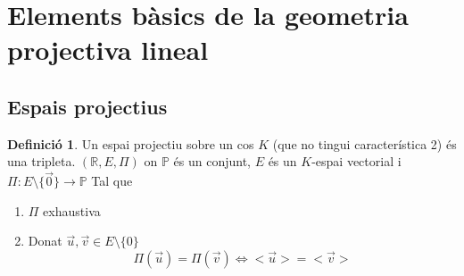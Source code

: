 \documentclass{article}
\theoremstyle{definition}
\newtheorem{definition}[theorem]{Definició}
\newcommand{\R}{\mathbb{R}}
\newcommand{\PP}{\mathbb{P}}
\begin{document}
\tableofcontents
\newpage

\section{Elements bàsics de la geometria projectiva lineal}
\subsection{Espais projectius}
\begin{definition}
Un espai projectiu sobre un cos $K$ (que no tingui característica 2) és una tripleta. $(\R, E, \Pi)$ on $\PP$ és un conjunt, $E$ és un $K$-espai vectorial i $\Pi:E\setminus\{\vec{0}\}\to\PP$
Tal que
\begin{enumerate}
\item $\Pi$ exhaustiva
\item Donat $\vec{u}, \vec{v} \in E\setminus\{0\}$
	$$\Pi (\vec{u}) = \Pi (\vec{v}) \Leftrightarrow <\vec{u}> = <\vec{v}>$$
\end{enumerate}
\end{definition}
\end{document}
